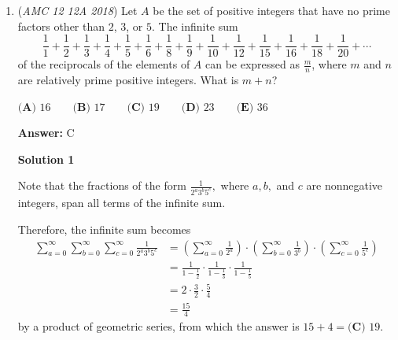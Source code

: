 \begin{enumerate}
 Adding these up, we see that the ratio of $[BGFD]$ to $[ABC]$ is $\frac{15}{24}=\frac{5}{8}$. $\frac{5}{8}\cdot120$ yields our answer of $75$.

 


 



\textbf{Solution 9}

Draw a nice diagram. Lets find some some areas. We will start by finding $[AED]$. The side length ratio of $\triangle{AED}$ to $\triangle{ACB}$ is $\dfrac{1}{2}$, so the area ratio is $\dfrac{1}{4}$, so $[AED] = \dfrac{1}{4} \cdot 120 = 30$. Lets look for information we have used yet. We still havent used the fact that $AG$ is an angle bisector. This hints at us using the angle bisector theorem. Letting $EF = y$, we have $FD = 5y$, and letting $CG = x$, $GB = 5x$. Now, we have
 \[\dfrac{[AEF]}{[AED]} = \dfrac{1}{6} \Longrightarrow [AEF] = \dfrac{1}{6} \cdot 30 = 5, [AFD] = \dfrac{5}{6} \cdot 30 = 25\]. Doing the same thing with triangles $ACG$ and $AGB$, we find that $[AGB] = 100$, and so $[FDGB] = 100-25 = \boxed{75}$

 -jb2015007

 \href{https://artofproblemsolving.com/videos/amc/2018amc10a/469}{https://artofproblemsolving.com/videos/amc/2018amc10a/469}

 


	\item (\textit{AMC 12 12A 2018}) Let $A$ be the set of positive integers that have no prime factors other than $2$, $3$, or $5$. The infinite sum 
 \[\frac{1}{1} + \frac{1}{2} + \frac{1}{3} + \frac{1}{4} + \frac{1}{5} + \frac{1}{6} + \frac{1}{8} + \frac{1}{9} + \frac{1}{10} + \frac{1}{12} + \frac{1}{15} + \frac{1}{16} + \frac{1}{18} + \frac{1}{20} + \cdots\]of the reciprocals of the elements of $A$ can be expressed as $\frac{m}{n}$, where $m$ and $n$ are relatively prime positive integers. What is $m+n$?


 $\textbf{(A) } 16 \qquad \textbf{(B) } 17 \qquad \textbf{(C) } 19 \qquad \textbf{(D) } 23 \qquad \textbf{(E) } 36$

 \textbf{Answer: }C



\textbf{Solution 1}

Note that the fractions of the form $\frac{1}{2^a3^b5^c},$ where $a,b,$ and $c$ are nonnegative integers, span all terms of the infinite sum.

 Therefore, the infinite sum becomes
 \begin{align*} \sum_{a=0}^{\infty}\sum_{b=0}^{\infty}\sum_{c=0}^{\infty}\frac{1}{2^a3^b5^c} &= \left(\sum_{a=0}^{\infty}\frac{1}{2^a}\right)\cdot\left(\sum_{b=0}^{\infty}\frac{1}{3^b}\right)\cdot\left(\sum_{c=0}^{\infty}\frac{1}{5^c}\right) \\ &= \frac{1}{1-\frac12}\cdot\frac{1}{1-\frac13}\cdot\frac{1}{1-\frac15} \\ &= 2\cdot\frac32\cdot\frac54 \\ &= \frac{15}{4} \end{align*}
by a product of geometric series, from which the answer is $15+4=\boxed{\textbf{(C) } 19}.$





\end{enumerate}
